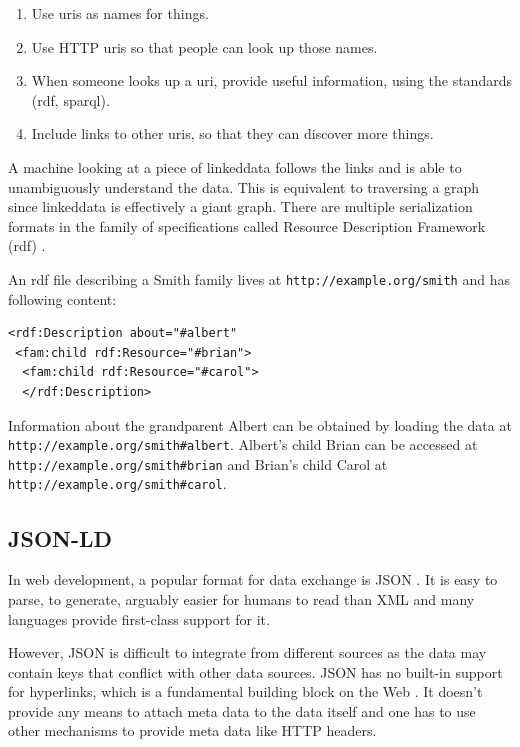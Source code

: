 \begin{enumerate}
  \item Use \gls{uri}s as names for things.
  \item Use HTTP \gls{uri}s so that people can look up those names.
  \item When someone looks up a \gls{uri}, provide useful information, using the standards (\gls{rdf}, \gls{sparql}).
  \item Include links to other \gls{uri}s, so that they can discover more things.
\end{enumerate}

A machine looking at a piece of \gls{linkeddata} follows the links and is able to unambiguously understand the data. This is equivalent to traversing a graph since \gls{linkeddata} is effectively a giant graph. There are multiple serialization formats in the family of specifications called Resource Description Framework (\gls{rdf}) \citep{rdfspecification}.

An \gls{rdf} file describing a Smith family lives at \lstinline{http://example.org/smith} and has following content:

\lstset{language=XML}
\begin{lstlisting}[caption= Simple example of a person as \gls{rdf}, label=rdfexample]
<rdf:Description about="#albert"
 <fam:child rdf:Resource="#brian">
  <fam:child rdf:Resource="#carol">
  </rdf:Description>
\end{lstlisting}

Information about the grandparent Albert can be obtained by loading the data at \lstinline{http://example.org/smith#albert}. Albert's child Brian can be accessed at \lstinline{http://example.org/smith#brian} and Brian's child Carol at \lstinline{http://example.org/smith#carol}.

\subsection{JSON-LD}\label{jsonld}
In web development, a popular format for data exchange is JSON \citep{jsonformat}. It is easy to parse, to generate, arguably easier for humans to read than XML and many languages provide first-class support for it.

However, JSON is difficult to integrate from different sources as the data may contain keys that conflict with other data sources. JSON has no built-in support for hyperlinks, which is a fundamental building block on the Web \citep{jsonldbasicconcepts}. It doesn't provide any means to attach meta data to the data itself and one has to use other mechanisms to provide meta data like HTTP headers.

